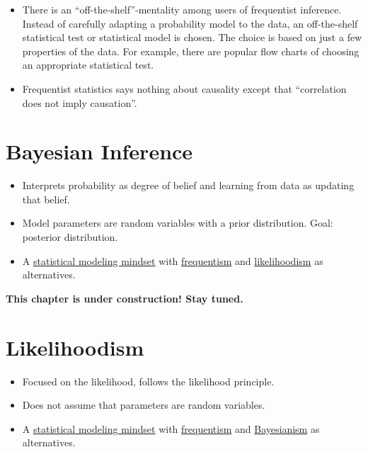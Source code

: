 \documentclass[
  10pt,
]{scrbook}
\providecommand{\tightlist}{%
  \setlength{\itemsep}{0pt}\setlength{\parskip}{0pt}}
\begin{document}
\begin{itemize}
\item
  There is an ``off-the-shelf''-mentality among users of frequentist inference. Instead of carefully adapting a probability model to the data, an off-the-shelf statistical test or statistical model is chosen. The choice is based on just a few properties of the data. For example, there are popular flow charts of choosing an appropriate statistical test.
\item
  Frequentist statistics says nothing about causality except that ``correlation does not imply causation''.
\end{itemize}

\hypertarget{bayesian}{%
\chapter{Bayesian Inference}\label{bayesian}}

\begin{itemize}
\tightlist
\item
  Interprets probability as degree of belief and learning from data as updating that belief.
\item
  Model parameters are random variables with a prior distribution. Goal: posterior distribution.
\item
  A \protect\hyperlink{statistical-modeling}{statistical modeling mindset} with \protect\hyperlink{frequentism}{frequentism} and \protect\hyperlink{likelihoodism}{likelihoodism} as alternatives.
\end{itemize}

\textbf{This chapter is under construction! Stay tuned.}

\hypertarget{likelihoodism}{%
\chapter{Likelihoodism}\label{likelihoodism}}

\begin{itemize}
\tightlist
\item
  Focused on the likelihood, follows the likelihood principle.
\item
  Does not assume that parameters are random variables.\\
\item
  A \protect\hyperlink{statistical-modeling}{statistical modeling mindset} with \protect\hyperlink{frequentism}{frequentism} and \protect\hyperlink{bayesianism}{Bayesianism} as alternatives.
\end{itemize}
\end{document}

